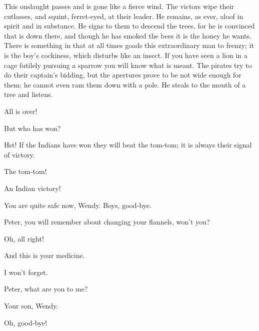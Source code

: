 \begin{drama}
{This onslaught passes and is gone like a fierce wind.
The victors wipe their cutlasses, and squint, ferret‐eyed, at their leader.
He remains, as ever, aloof in spirit and in substance.
He signs to them to descend the trees, for he is convinced that  is down there,
and though he has smoked the bees it is the honey he wants.
There is something in \peter that at all times goads this extraordinary man to frenzy;
it is the boy’s cockiness, which disturbs \hook like an insect.
If you have seen a lion in a cage futilely pursuing a sparrow you will know what is meant.
The pirates try to do their captain’s bidding, but the apertures prove to be not wide enough for them;
he cannot even ram them down with a pole.
He steals to the mouth of a tree and listens.}

All is over!

\wendyspeaks
But who has won?

\peterspeaks
Hst!
If the Indians have won they will beat the tom‐tom; it is always their signal of victory.


\tootlesspeaks
The tom‐tom!

An Indian victory!


You are quite safe now, Wendy.
Boys, good‐bye.

\wendyspeaks
Peter, you will remember about changing your flannels, won’t you?

\peterspeaks
Oh, all right!

\wendyspeaks
And this is your medicine.


\peterspeaks
I won’t forget.

\wendyspeaks
Peter, what are you to me?

Your son, Wendy.

\wendyspeaks
Oh, good‐bye!

\end{drama}
